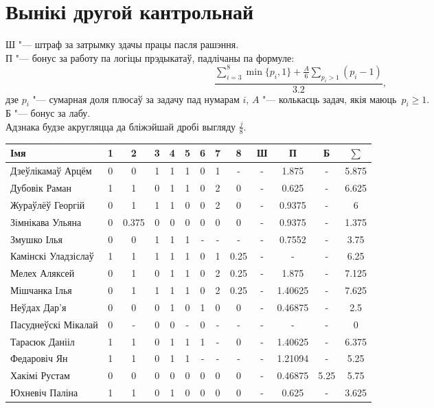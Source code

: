 \documentclass[12pt, a4paper]{extarticle}
\begin{document}
    \section{Вынікі другой кантрольнай}
    \noindent Ш "--- штраф за затрымку здачы працы пасля рашэння. \\
    П "--- бонус за работу па логіцы прэдыкатаў, падлічаны па формуле:
    $$\dfrac{\sum \limits _{i=3} ^8 \min\{p_i, 1\} + \frac{A}{6} \sum \limits _{p_i > 1} (p_i - 1)}{3.2},$$
    дзе $p_i$ "--- сумарная доля плюсаў за задачу пад нумарам $i$, $A$ "--- колькасць задач, якія маюць~$p_i \geqslant 1$. \\
    Б "--- бонус за лабу. \\
    Адзнака будзе акругляцца да бліжэйшай дробі выгляду $\frac{j}{8}$.
    \begin{table}[H]
        \begin{tabular}{|l|c|c|c|c|c|c|c|c|c|c|c|c|}
            \hline
            Імя                 &  1 &   2   & 3 & 4 & 5 & 6 & 7 &  8   & Ш &    П    &  Б   & $\sum$ \\ \hline
            Дзеўлікамаў Арцём   &  0 &   0   & 1 & 1 & 1 & 0 & 1 &  -   & - &  1.875  &  -   & 5.875  \\ \hline
            Дубовік Раман       &  1 &   1   & 0 & 1 & 1 & 0 & 2 &  0   & - &  0.625  &  -   & 6.625  \\ \hline
            Жураўлёў Георгій    &  0 &   1   & 1 & 1 & 0 & 0 & 2 &  0   & - & 0.9375  &  -   &   6    \\ \hline
            Зімнікава Ульяна    &  0 & 0.375 & 0 & 0 & 0 & 0 & 0 &  0   & - & 0.9375  &  -   & 1.375  \\ \hline
            Змушко Ілья         &  0 &   0   & 1 & 1 & 1 & - & - &  -   & - & 0.7552  &  -   &  3.75  \\ \hline
            Камінскі Уладзіслаў &  1 &   1   & 1 & 1 & 1 & 0 & 1 & 0.25 & - &    -    &  -   &  6.25  \\ \hline
            Мелех Аляксей       &  0 &   1   & 0 & 1 & 1 & 0 & 2 & 0.25 & - &  1.875  &  -   & 7.125  \\ \hline
            Мішчанка Ілья       &  0 &   1   & 1 & 1 & 1 & 0 & 2 & 0.25 & - & 1.40625 &  -   & 7.625  \\ \hline
            Неўдах Дар'я        &  0 &   0   & 0 & 1 & 0 & 1 & 0 &  0   & - & 0.46875 &  -   &  2.5   \\ \hline
            Пасуднеўскі Мікалай &  0 &   -   & 0 & 0 & - & 0 & - &  -   & - &    -    &  -   &   0    \\ \hline
            Тарасюк Данііл      &  1 &   1   & 0 & 1 & 1 & 1 & - &  0   & - & 1.40625 &  -   & 6.375  \\ \hline
            Федаровіч Ян        &  1 &   1   & 0 & 1 & 1 & - & - &  -   & - & 1.21094 &  -   &  5.25  \\ \hline
            Хакімі Рустам       &  0 &   0   & 0 & 0 & 0 & 0 & 0 &  0   & - & 0.46875 & 5.25 &  5.75  \\ \hline
            Юхневіч Паліна      &  1 &   1   & 0 & 1 & 0 & 0 & 0 &  0   & - &  0.625  &  -   & 3.625  \\ \hline
        \end{tabular}
    \end{table}
\end{document}
